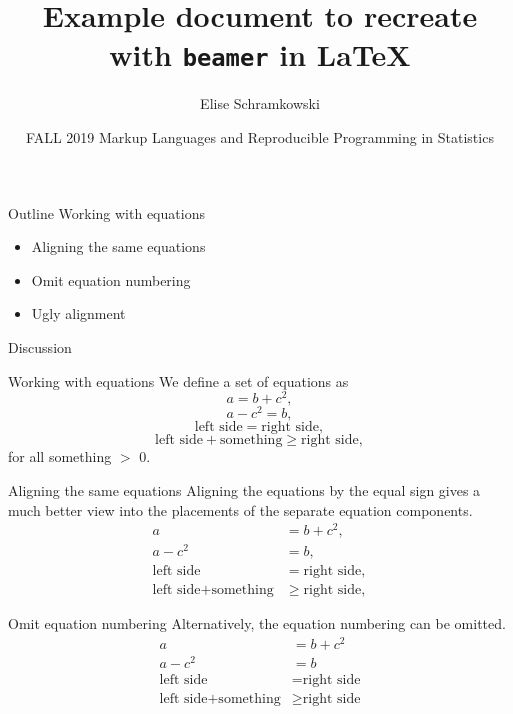 \documentclass[aspectratio=169]{beamer}
\title{Example document to recreate with \texttt{beamer} in \LaTeX}
\author[E. Schramkowski]{Elise Schramkowski}
\date[FALL 2019]{\newline
\newline 
\newline 
\newline 
FALL 2019\newline
Markup Languages and Reproducible Programming in Statistics}
\begin{document}
\begin{frame}
  \titlepage
\end{frame}

\begin{frame}{Outline}
  Working with equations
\begin{itemize}
\item[] Aligning the same equations
\item[] Omit equation numbering
\item[] Ugly alignment
\end{itemize}
\vspace{1cm}
Discussion
\end{frame}

\begin{frame}{Working with equations}
  We define a set of equations as
 \begin{equation}
 a = b+c^2,
 \end{equation}
 \begin{equation}
  a - c^2 = b,
 \end{equation}
 \begin{equation}
\text{left side} = \text{right side},
 \end{equation}
 \begin{equation}
\text{left side} + \text{something} \geq \text{right side},
 \end{equation}
 for all something $>$ 0. 
\end{frame}

\begin{frame}{Aligning the same equations}
Aligning the equations by the equal sign gives a much better view into the placements of the separate equation components.
\begin{align}
 a&=b+c^2,\\
 a - c^2&=b,\\
\text{left side} &= \text{right side},\\
\text{left side} + \text{something} & \geq \text{right side},
\end{align}
\end{frame}

\begin{frame}{Omit equation numbering}
Alternatively, the equation numbering can be omitted.
\begin{align*}
 a&=b+c^2\\
 a - c^2&=b\\
\text{left side} &= \text{right side}\\
\text{left side} + \text{something} & \geq \text{right side}
\end{align*}
\end{frame}
\end{document}
